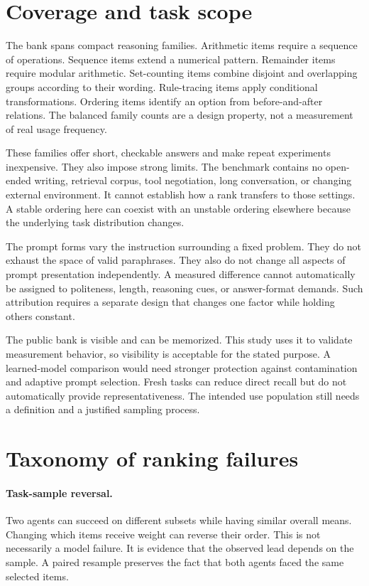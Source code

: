 \documentclass{article}
\begin{document}
\section{Coverage and task scope}

The bank spans \Families{} compact reasoning families. Arithmetic items require a sequence of operations. Sequence items extend a numerical pattern. Remainder items require modular arithmetic. Set-counting items combine disjoint and overlapping groups according to their wording. Rule-tracing items apply conditional transformations. Ordering items identify an option from before-and-after relations. The balanced family counts are a design property, not a measurement of real usage frequency.\par
These families offer short, checkable answers and make repeat experiments inexpensive. They also impose strong limits. The benchmark contains no open-ended writing, retrieval corpus, tool negotiation, long conversation, or changing external environment. It cannot establish how a rank transfers to those settings. A stable ordering here can coexist with an unstable ordering elsewhere because the underlying task distribution changes.\par
The prompt forms vary the instruction surrounding a fixed problem. They do not exhaust the space of valid paraphrases. They also do not change all aspects of prompt presentation independently. A measured difference cannot automatically be assigned to politeness, length, reasoning cues, or answer-format demands. Such attribution requires a separate design that changes one factor while holding others constant.\par
The public bank is visible and can be memorized. This study uses it to validate measurement behavior, so visibility is acceptable for the stated purpose. A learned-model comparison would need stronger protection against contamination and adaptive prompt selection. Fresh tasks can reduce direct recall but do not automatically provide representativeness. The intended use population still needs a definition and a justified sampling process.\par
\section{Taxonomy of ranking failures}
\paragraph{Task-sample reversal.} Two agents can succeed on different subsets while having similar overall means. Changing which items receive weight can reverse their order. This is not necessarily a model failure. It is evidence that the observed lead depends on the sample. A paired resample preserves the fact that both agents faced the same selected items.\par
\end{document}

